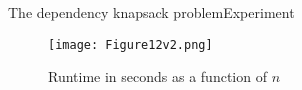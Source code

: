 \documentclass{beamer}
\begin{document}
\begin{frame}{The dependency knapsack problem}{Experiment } %
    \begin{figure}
        \centering
        \texttt{[image: Figure12v2.png]}
        \caption{Runtime in seconds as a function of $n$}
    \end{figure}
\end{frame}
\begin{comment}
\begin{frame}{The dependency knapsack problem}{Experiment II} %
    \begin{itemize}
        \item {We want to compare between the two approximations.}
        \item {Also we want to explore the $(1+\varepsilon)$ approximation 
        for different $\varepsilon$.}    
    \end{itemize}
    \begin{block}{Experiment II}
    For each $n=1,11,21,...,141$ we generated each time $n$ random transactions
    $a_i$ such that $1\leq s_i \leq 200$ and $1\leq f_i\leq 100$. $W=10000$. 
    The dependencies are also generated randomly such that there are no 
    circular dependencies. The data points are calculated as the average of 
    10 runs. If $|V_a^C| > 15$ it is reduced to 15 using the fee criterion.
    \end{block}
\end{frame}

\begin{frame}{The dependency knapsack problem}{Experiment II} %
    \begin{figure}
        \centering
        \texttt{[image: Figure13v2.png]}
        \caption{Runtime in seconds as a function of $n$}
    \end{figure}
\end{frame}

\begin{frame}{The dependency knapsack problem}{Experiment II} %
    \begin{figure}
        \centering
        \texttt{[image: Figure14v2.png]}
        \caption{Profit relative to the greedy approximation as a function
        of $n$}
    \end{figure}
\end{frame}
\end{comment}
\end{document}
